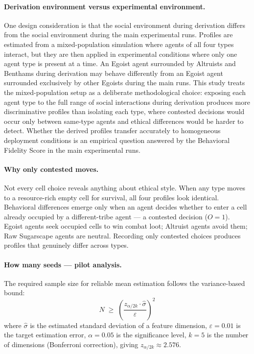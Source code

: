 \documentclass{icsthesis}
\begin{document}
\begin{mainmatter}
\paragraph{Derivation environment versus experimental environment.}
One design consideration is that the social environment during derivation differs from the social environment during the main experimental runs. Profiles are estimated from a mixed-population simulation where agents of all four types interact, but they are then applied in experimental conditions where only one agent type is present at a time. An Egoist agent surrounded by Altruists and Benthams during derivation may behave differently from an Egoist agent surrounded exclusively by other Egoists during the main runs. This study treats the mixed-population setup as a deliberate methodological choice: exposing each agent type to the full range of social interactions during derivation produces more discriminative profiles than isolating each type, where contested decisions would occur only between same-type agents and ethical differences would be harder to detect. Whether the derived profiles transfer accurately to homogeneous deployment conditions is an empirical question answered by the Behavioral Fidelity Score in the main experimental runs.

\paragraph{Why only contested moves.}
Not every cell choice reveals anything about ethical style. When any type moves to a resource-rich empty cell for survival, all four profiles look identical. Behavioral differences emerge only when an agent decides whether to enter a cell already occupied by a different-tribe agent --- a contested decision ($O = 1$). Egoist agents seek occupied cells to win combat loot; Altruist agents avoid them; Raw Sugarscape agents are neutral. Recording only contested choices produces profiles that genuinely differ across types.

\paragraph{How many seeds --- pilot analysis.}
The required sample size for reliable mean estimation follows the variance-based bound:
\[
N \;\geq\; \left(\frac{z_{\alpha / 2k} \cdot \hat{\sigma}}{\varepsilon}\right)^2
\]
where $\hat{\sigma}$ is the estimated standard deviation of a feature dimension, $\varepsilon = 0.01$ is the target estimation error, $\alpha = 0.05$ is the significance level, $k = 5$ is the number of dimensions (Bonferroni correction), giving $z_{\alpha/2k} \approx 2.576$.


\end{mainmatter}
\end{document}
